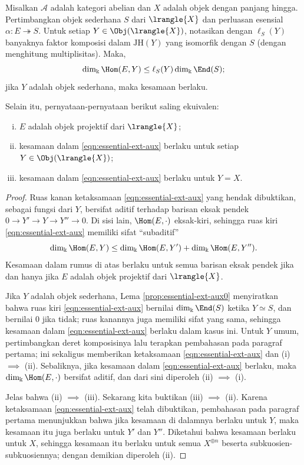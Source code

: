 \begin{lemma}\label{prop:essential-ext}
	Misalkan $\mathcal{A}$ adalah kategori abelian dan $X$ adalah objek dengan panjang hingga. Pertimbangkan objek sederhana $S$ dari $\lrangle{X}$ dan perluasan esensial $\alpha: E \twoheadrightarrow S$. Untuk setiap $Y \in \Obj(\lrangle{X})$, notasikan dengan $\ell_S(Y)$ banyaknya faktor komposisi dalam $\mathrm{JH}(Y)$ yang isomorfik dengan $S$ (dengan menghitung multiplisitas). Maka,
	\begin{equation}\label{eqn:essential-ext-aux}
		\dim_{\Bbbk} \Hom(E, Y) \leq \ell_S(Y) \dim_{\Bbbk} \End(S);
	\end{equation}
	jika $Y$ adalah objek sederhana, maka kesamaan berlaku.
	
	Selain itu, pernyataan-pernyataan berikut saling ekuivalen:
	\begin{enumerate}[(i)]
		\item $E$ adalah objek projektif dari $\lrangle{X}$;
		\item kesamaan dalam \eqref{eqn:essential-ext-aux} berlaku untuk setiap $Y \in \Obj(\lrangle{X})$;
		\item kesamaan dalam \eqref{eqn:essential-ext-aux} berlaku untuk $Y = X$.
	\end{enumerate}
\end{lemma}
\begin{proof}
	Ruas kanan ketaksamaan \eqref{eqn:essential-ext-aux} yang hendak dibuktikan, sebagai fungsi dari $Y$, bersifat aditif terhadap barisan eksak pendek $0 \to Y' \to Y \to Y'' \to 0$. Di sisi lain, $\Hom(E, \cdot)$ eksak-kiri, sehingga ruas kiri \eqref{eqn:essential-ext-aux} memiliki sifat ``subaditif''
	\[ \dim_{\Bbbk} \Hom(E, Y) \leq \dim_{\Bbbk} \Hom(E, Y') + \dim_{\Bbbk} \Hom(E, Y''). \]
	Kesamaan dalam rumus di atas berlaku untuk semua barisan eksak pendek jika dan hanya jika $E$ adalah objek projektif dari $\lrangle{X}$.
	
	Jika $Y$ adalah objek sederhana, Lema \ref{prop:essential-ext-aux0} menyiratkan bahwa ruas kiri \eqref{eqn:essential-ext-aux} bernilai $\dim_{\Bbbk} \End(S)$ ketika $Y \simeq S$, dan bernilai $0$ jika tidak; ruas kanannya juga memiliki sifat yang sama, sehingga kesamaan dalam \eqref{eqn:essential-ext-aux} berlaku dalam kasus ini. Untuk $Y$ umum, pertimbangkan deret komposisinya lalu terapkan pembahasan pada paragraf pertama; ini sekaligus memberikan ketaksamaan \eqref{eqn:essential-ext-aux} dan (i) $\implies$ (ii). Sebaliknya, jika kesamaan dalam \eqref{eqn:essential-ext-aux} berlaku, maka $\dim_{\Bbbk} \Hom(E, \cdot)$ bersifat aditif, dan dari sini diperoleh (ii) $\implies$ (i).
	
	Jelas bahwa (ii) $\implies$ (iii). Sekarang kita buktikan (iii) $\implies$ (ii). Karena ketaksamaan \eqref{eqn:essential-ext-aux} telah dibuktikan, pembahasan pada paragraf pertama menunjukkan bahwa jika kesamaan di dalamnya berlaku untuk $Y$, maka kesamaan itu juga berlaku untuk $Y'$ dan $Y''$. Diketahui bahwa kesamaan berlaku untuk $X$, sehingga kesamaan itu berlaku untuk semua $X^{\oplus n}$ beserta subkuosien-subkuosiennya; dengan demikian diperoleh (ii).
\end{proof}

